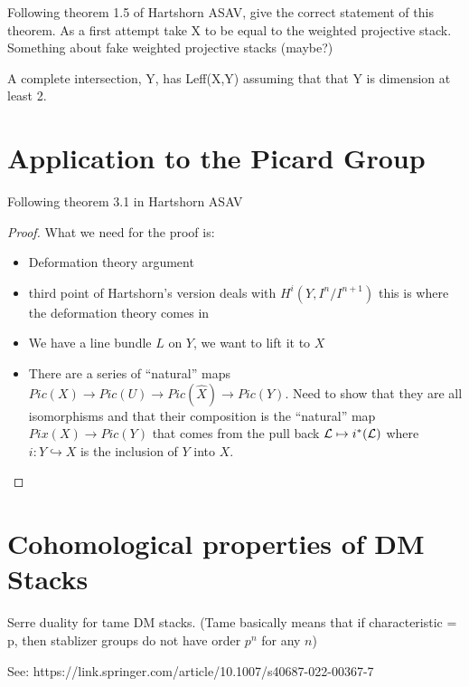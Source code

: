 \documentclass{article}
\begin{document}
    \begin{theorem}
        Following theorem 1.5 of Hartshorn ASAV, give the correct statement of this theorem. As a first attempt take X to be
        equal to the weighted projective stack. Something about fake weighted projective stacks (maybe?)

        A complete intersection, Y, has Leff(X,Y) assuming that that Y is dimension at least 2.
    \end{theorem}

    \section{Application to the Picard Group}
    
    \begin{theorem}
        Following theorem 3.1 in Hartshorn ASAV
        \begin{proof}
            What we need for the proof is:
            \begin{itemize}
                \item Deformation theory argument
                \item third point of Hartshorn's version deals with $H^i(Y,I^n/I^{n+1})$ this is where the deformation theory comes in
                \item We have a line bundle $L$ on $Y$, we want to lift it to $X$
                \item There are a series of ``natural'' maps $Pic(X) \to Pic(U) \to Pic(\widehat{X}) \to Pic(Y)$. Need to show that
                      they are all isomorphisms and that their composition is the ``natural'' map $Pix(X) \to Pic(Y)$ that comes
                      from the pull back $\mathcal{L} \mapsto i^*(\mathcal{L})$ where $i: Y \hookrightarrow X$ is the inclusion of $Y$ into $X$.
            \end{itemize}
        \end{proof}
    \end{theorem}

    \section{Cohomological properties of DM Stacks}
    Serre duality for tame DM stacks. (Tame basically means that if characteristic = p, then stablizer groups do not have order 
    $p^n$ for any $n$)

    See: https://link.springer.com/article/10.1007/s40687-022-00367-7
\end{document}
